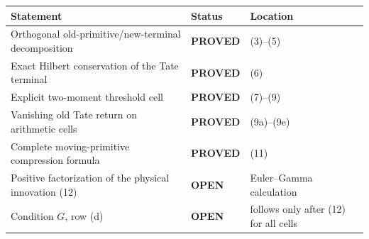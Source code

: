 \documentclass[11pt]{article}
\newcommand{\PROVED}{\textcolor{green!40!black}{\textbf{PROVED}}}
\newcommand{\OPEN}{\textcolor{red!70!black}{\textbf{OPEN}}}
\begin{document}
\begin{center}
\begin{tabular}{>{\raggedright\arraybackslash}p{.55\linewidth}
                >{\centering\arraybackslash}p{.15\linewidth}
                >{\raggedright\arraybackslash}p{.20\linewidth}}
\toprule
Statement & Status & Location \\
\midrule
Orthogonal old-primitive/new-terminal decomposition & \PROVED & (3)--(5) \\
Exact Hilbert conservation of the Tate terminal & \PROVED & (6) \\
Explicit two-moment threshold cell & \PROVED & (7)--(9) \\
Vanishing old Tate return on arithmetic cells & \PROVED & (9a)--(9e) \\
Complete moving-primitive compression formula & \PROVED & (11) \\
Positive factorization of the physical innovation (12) & \OPEN & Euler--Gamma calculation \\
Condition $G$, row (d) & \OPEN & follows only after (12) for all cells \\
\bottomrule
\end{tabular}
\end{center}
\end{document}
